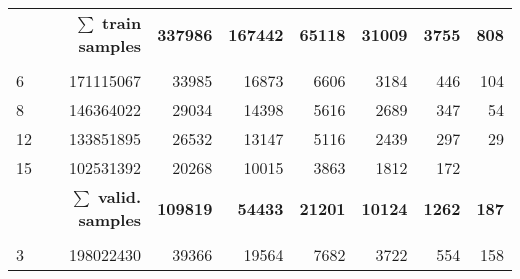 \begin{table}[hbp]
\begin{tabular}{lrrrrrrr}
\multicolumn{2}{r}{$\mathbf{\sum}$ \textbf{train samples}}                          & \textbf{337986} & \textbf{167442}  & \textbf{65118}   & \textbf{31009}   & \textbf{3755}   & \textbf{808}                      \\
                                                         &                                                         &                        &                         &                         &                         &                          &                          \\
6                                                        & 171115067                                               & 33985                  & 16873                   & 6606                    & 3184                    & 446                      & 104                      \\
8                                                        & 146364022                                               & 29034                  & 14398                   & 5616                    & 2689                    & 347                      & 54                       \\
12                                                       & 133851895                                               & 26532                  & 13147                   & 5116                    & 2439                    & 297                      & 29                       \\
15                                                       & 102531392                                               & 20268                  & 10015                   & 3863                    & 1812                    & 172                      &                          \\
\multicolumn{2}{r}{$\mathbf{\sum}$ \textbf{valid. samples}}                  & \textbf{109819}    & \textbf{54433}       & \textbf{21201}    & \textbf{10124}     & \textbf{1262}         & \textbf{187}    \\
                                                         &                                                         &                        &                         &                         &                         &                          &                          \\
3                                                        & 198022430                                               & 39366                  & 19564                   & 7682                    & 3722                    & 554                      & 158                      \\

\end{tabular}
\end{table}
